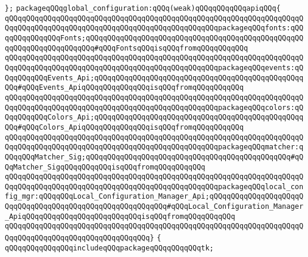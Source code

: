 \verb|};|\newline
\newline
\verb|packageqQQqglobal_configuration:qQQq(weak)qQQqqQQqqQQqapiqQQq{|\newline
\verb|qQQqqQQqqQQqqQQqqQQqqQQqqQQqqQQqqQQqqQQqqQQqqQQqqQQqqQQqqQQqqQQqqQQqqQQqqQQqqQQqqQQqqQQqqQQqqQQqqQQqqQQqqQQqqQQqqQQqqQQqpackageqQQqfonts:qQQqqQQqqQQqqQQqFonts;qQQqqQQqqQQqqQQqqQQqqQQqqQQqqQQqqQQqqQQqqQQqqQQqqQQqqQQqqQQqqQQqqQQqqQQq#qQQqFontsqQQqisqQQqfromqQQqqQQqqQQq|\newline
\verb|qQQqqQQqqQQqqQQqqQQqqQQqqQQqqQQqqQQqqQQqqQQqqQQqqQQqqQQqqQQqqQQqqQQqqQQqqQQqqQQqqQQqqQQqqQQqqQQqqQQqqQQqqQQqqQQqqQQqqQQqpackageqQQqevents:qQQqqQQqqQQqEvents_Api;qQQqqQQqqQQqqQQqqQQqqQQqqQQqqQQqqQQqqQQqqQQqqQQqqQQq#qQQqEvents_ApiqQQqqQQqqQQqqQQqisqQQqfromqQQqqQQqqQQq|\newline
\verb|qQQqqQQqqQQqqQQqqQQqqQQqqQQqqQQqqQQqqQQqqQQqqQQqqQQqqQQqqQQqqQQqqQQqqQQqqQQqqQQqqQQqqQQqqQQqqQQqqQQqqQQqqQQqqQQqqQQqqQQqpackageqQQqcolors:qQQqqQQqqQQqColors_Api;qQQqqQQqqQQqqQQqqQQqqQQqqQQqqQQqqQQqqQQqqQQqqQQqqQQq#qQQqColors_ApiqQQqqQQqqQQqqQQqisqQQqfromqQQqqQQqqQQq|\newline
\verb|qQQqqQQqqQQqqQQqqQQqqQQqqQQqqQQqqQQqqQQqqQQqqQQqqQQqqQQqqQQqqQQqqQQqqQQqqQQqqQQqqQQqqQQqqQQqqQQqqQQqqQQqqQQqqQQqqQQqqQQqpackageqQQqmatcher:qQQqqQQqMatcher_Sig;qQQqqQQqqQQqqQQqqQQqqQQqqQQqqQQqqQQqqQQqqQQqqQQq#qQQqMatcher_SigqQQqqQQqqQQqisqQQqfromqQQqqQQqqQQq|\newline
\verb|qQQqqQQqqQQqqQQqqQQqqQQqqQQqqQQqqQQqqQQqqQQqqQQqqQQqqQQqqQQqqQQqqQQqqQQqqQQqqQQqqQQqqQQqqQQqqQQqqQQqqQQqqQQqqQQqqQQqqQQqpackageqQQqlocal_config_mgr:qQQqqQQqLocal_Configuration_Manager_Api;qQQqqQQqqQQqqQQqqQQqqQQqqQQqqQQqqQQqqQQqqQQqqQQqqQQqqQQqqQQq#qQQqLocal_Configuration_Manager_ApiqQQqqQQqqQQqqQQqqQQqqQQqqQQqisqQQqfromqQQqqQQqqQQq|\newline
\verb|qQQqqQQqqQQqqQQqqQQqqQQqqQQqqQQqqQQqqQQqqQQqqQQqqQQqqQQqqQQqqQQqqQQqqQQqqQQqqQQqqQQqqQQqqQQqqQQqqQQqqQQq}|\newline
\verb|{|\newline
\verb|qQQqqQQqqQQqqQQqincludeqQQqpackageqQQqqQQqqQQqtk;|\newline

